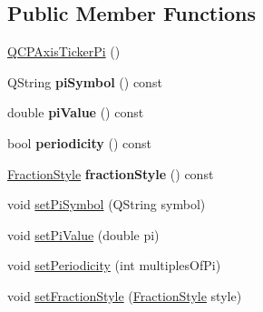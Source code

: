 \subsection*{Public Member Functions}
\begin{DoxyCompactItemize}
\item 
\hyperlink{class_q_c_p_axis_ticker_pi_aa0d7b7034055927c0f0077a2d713d7d0}{Q\+C\+P\+Axis\+Ticker\+Pi} ()
\item 
\mbox{\label{class_q_c_p_axis_ticker_pi_a2fd785cd66a6f4f969ac2eca1b08e0f2}} 
Q\+String {\bfseries pi\+Symbol} () const
\item 
\mbox{\label{class_q_c_p_axis_ticker_pi_abddc18799caa4ae6c721e1e5e229b3a4}} 
double {\bfseries pi\+Value} () const
\item 
\mbox{\label{class_q_c_p_axis_ticker_pi_aa320edf0a30386ce6a63c18050fbdfd8}} 
bool {\bfseries periodicity} () const
\item 
\mbox{\label{class_q_c_p_axis_ticker_pi_ab532d5e838168a8a5bbafea4eafc94be}} 
\hyperlink{class_q_c_p_axis_ticker_pi_a262f1534c7f0c79a7d5237f5d1e2c54c}{Fraction\+Style} {\bfseries fraction\+Style} () const
\item 
void \hyperlink{class_q_c_p_axis_ticker_pi_acfdcd4758a393bde4be12a50fb2017b5}{set\+Pi\+Symbol} (Q\+String symbol)
\item 
void \hyperlink{class_q_c_p_axis_ticker_pi_a36ce0651d2ec92edd36feac1619c2468}{set\+Pi\+Value} (double pi)
\item 
void \hyperlink{class_q_c_p_axis_ticker_pi_a58f538dc01860fb56e46970e28a87f03}{set\+Periodicity} (int multiples\+Of\+Pi)
\item 
void \hyperlink{class_q_c_p_axis_ticker_pi_a760c8af6ca68178e607556c4e5049d71}{set\+Fraction\+Style} (\hyperlink{class_q_c_p_axis_ticker_pi_a262f1534c7f0c79a7d5237f5d1e2c54c}{Fraction\+Style} style)
\end{DoxyCompactItemize}
